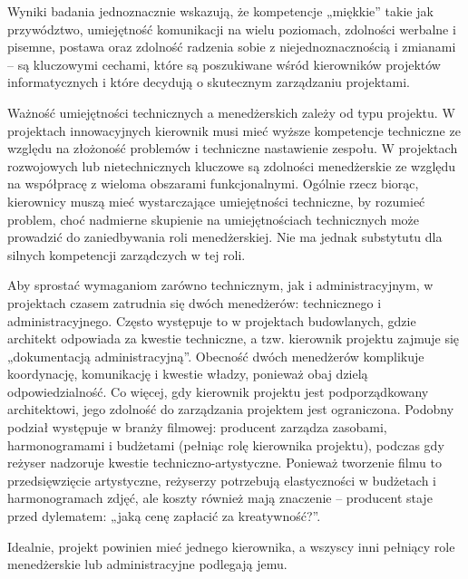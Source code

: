 Wyniki badania jednoznacznie wskazują, że kompetencje „miękkie” takie jak przywództwo, umiejętność komunikacji na wielu poziomach, zdolności werbalne i pisemne, postawa oraz zdolność radzenia sobie z niejednoznacznością i zmianami – są kluczowymi cechami, które są poszukiwane wśród kierowników projektów informatycznych i które decydują o skutecznym zarządzaniu projektami.\autocite{stevenson2010pm}

Ważność umiejętności technicznych a menedżerskich zależy od typu projektu. W projektach innowacyjnych kierownik musi mieć wyższe kompetencje techniczne ze względu na złożoność problemów i techniczne nastawienie zespołu. W projektach rozwojowych lub nietechnicznych kluczowe są zdolności menedżerskie ze względu na współpracę z wieloma obszarami funkcjonalnymi. Ogólnie rzecz biorąc, kierownicy muszą mieć wystarczające umiejętności techniczne, by rozumieć problem, choć nadmierne skupienie na umiejętnościach technicznych może prowadzić do zaniedbywania roli menedżerskiej. Nie ma jednak substytutu dla silnych kompetencji zarządczych w tej roli.

Aby sprostać wymaganiom zarówno technicznym, jak i administracyjnym, w projektach czasem zatrudnia się dwóch menedżerów: technicznego i administracyjnego. Często występuje to w projektach budowlanych, gdzie architekt odpowiada za kwestie techniczne, a tzw. kierownik projektu zajmuje się „dokumentacją administracyjną”. Obecność dwóch menedżerów komplikuje koordynację, komunikację i kwestie władzy, ponieważ obaj dzielą odpowiedzialność. Co więcej, gdy kierownik projektu jest podporządkowany architektowi, jego zdolność do zarządzania projektem jest ograniczona. Podobny podział występuje w branży filmowej: producent zarządza zasobami, harmonogramami i budżetami (pełniąc rolę kierownika projektu), podczas gdy reżyser nadzoruje kwestie techniczno-artystyczne. Ponieważ tworzenie filmu to przedsięwzięcie artystyczne, reżyserzy potrzebują elastyczności w budżetach i harmonogramach zdjęć, ale koszty również mają znaczenie – producent staje przed dylematem: „jaką cenę zapłacić za kreatywność?”.

Idealnie, projekt powinien mieć jednego kierownika, a wszyscy inni pełniący role menedżerskie lub administracyjne podlegają jemu.\autocite{NicholasSteyn}